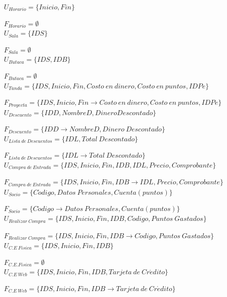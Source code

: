 	$U_{Horario}=\{Inicio, Fin\}$
		
	$F_{Horario}=\emptyset$\\
	
	$U_{Sala}=\{IDS\}$
	
	$F_{Sala}=\emptyset$\\
	
	$U_{Butaca}=\{IDS,IDB\}$
		
	$F_{Butaca}=\emptyset$\\
	
	$U_{Tanda}=\{IDS, Inicio, Fin, Costo~en~dinero, Costo~en~puntos, IDPe\}$
	
	$F_{Proyecta}=\{IDS, Inicio, Fin\rightarrow Costo~en~dinero, Costo~en~puntos, IDPe\}$\\
	
	$U_{Descuento}=\{IDD, NombreD, DineroDescontado\}$
		
	$F_{Descuento}=\{IDD\rightarrow NombreD, Dinero~Descontado\}$\\
	
	$U_{Lista~de~Descuentos}=\{IDL,Total~Descontado\}$
		
	$F_{Lista~de~Descuentos}=\{IDL\rightarrow Total~Descontado\}$\\
	
	$U_{Compra~de~Entrada}=\{IDS, Inicio, Fin, IDB, IDL, Precio, Comprobante\}$
		
	$F_{Compra~de~Entrada}=\{IDS, Inicio, Fin,IDB\rightarrow IDL, Precio, Comprobante\}$\\
	
	$U_{Socio}=\{C\acute{o}digo,Datos~Personales,Cuenta(puntos)\}$
		
	$F_{Socio}=\{C\acute{o}digo\rightarrow Datos~Personales,Cuenta(puntos)\}$\\
	
	$U_{Realizar~Compra}=\{IDS,Inicio,Fin,IDB,C\acute{o}digo,Puntos~Gastados\}$
		
	$F_{Realizar~Compra}=\{IDS,Inicio,Fin,IDB\rightarrow C\acute{o}digo,Puntos~Gastados\}$\\
	
	$U_{C.E~Fisica}=\{IDS,Inicio,Fin,IDB\}$
		
	$F_{C.E. Fisica}=\emptyset$\\
	
	$U_{C.E~Web}=\{IDS,Inicio,Fin,IDB,Tarjeta~de~Cr\acute{e}dito\}$
		
	$F_{C.E~Web}=\{IDS,Inicio,Fin,IDB\rightarrow Tarjeta~de~Cr\acute{e}dito\}$\\
		
